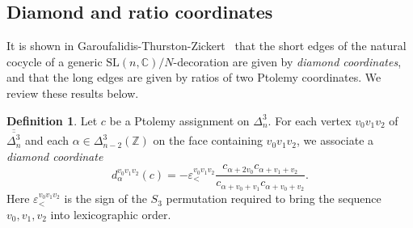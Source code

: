 \documentclass[12pt]{amsart}
\theoremstyle{definition}
\newtheorem{definition}[theorem]{Definition}
\numberwithin{equation}{section}
\def\SL{\mathrm{SL}}
\def\Z{\mathbb{Z}}
\def\C{\mathbb{C}}
\begin{document}
\subsection{Diamond and ratio coordinates}

It is shown in Garoufalidis-Thurston-Zickert~\cite{GaroufalidisThurstonZickert} that the short edges of the natural cocycle of a generic $\SL(n,\C)/N$-decoration are given by \emph{diamond coordinates}, and that the long edges are given by ratios of two Ptolemy coordinates. We review these results below.%



\begin{definition}
Let $c$ be a Ptolemy assignment on $\Delta_n^3$. For each vertex $v_0v_1v_2$ of $\overline{\overline{\Delta^3_n}}$ and each $\alpha\in\Delta^3_{n-2}(\Z)$ on the face containing $v_0v_1v_2$, we associate a \emph{diamond coordinate}
\begin{equation}\label{eq:DiamondDef}
d^{v_0v_1v_2}_\alpha(c)= - \varepsilon_<^{v_0v_1v_2} \frac{c_{\alpha+2v_0}c_{\alpha+v_1+v_2}}{c_{\alpha+v_0+v_1}c_{\alpha+v_0+v_2}}.
\end{equation}
Here $\varepsilon_<^{v_0v_1v_2}$ is the sign of the $S_3$ permutation required to bring the sequence $v_0,v_1,v_2$ into lexicographic order.
\end{definition}
\end{document}
